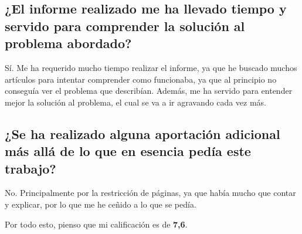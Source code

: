 \documentclass[runningheads]{llncs}
\begin{document}
\subsection{¿El informe realizado me ha llevado tiempo y servido para comprender la solución al problema abordado?}
Sí. Me ha requerido mucho tiempo realizar el informe, ya que he buscado muchos artículos para intentar comprender como funcionaba, ya que al principio no conseguía ver el problema que describían. Además, me ha servido para entender mejor la solución al problema, el cual se va a ir agravando cada vez más.

\subsection{¿Se ha realizado alguna aportación adicional más allá de lo que en esencia pedía este trabajo?}
No. Principalmente por la restricción de páginas, ya que había mucho que contar y explicar, por lo que me he ceñido a lo que se pedía.

\bigskip

Por todo esto, pienso que mi calificación es de \textbf{7,6}.
\end{document}
